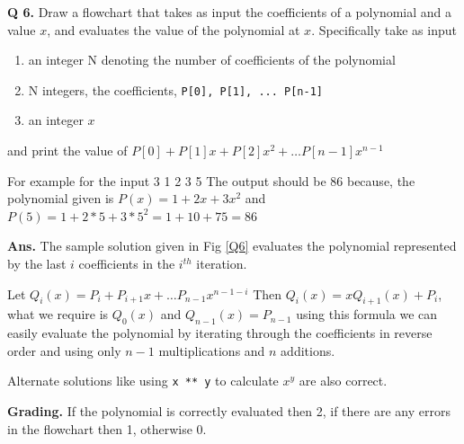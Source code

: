 \documentclass{article}
\begin{document}
\clearpage


\begin{flushleft}

\textbf{Q 6. } Draw a flowchart that takes as input the coefficients of a polynomial and a value $x$, 
and evaluates the value of the polynomial at $x$. Specifically take as input
\begin{enumerate}
    \item an integer N denoting the number of coefficients of the polynomial
    \item N integers, the coefficients, \lstinline{P[0], P[1], ... P[n-1]}
    \item an integer $x$
\end{enumerate}
and print the value of $P[0] + P[1] x + P[2] x^2 + \ldots P[n-1] x^{n-1}$

For example for the input
    3
    1 2 3
    5
The output should be 
    86
because, the polynomial given is $P(x) = 1 + 2x + 3x^2$
and $P(5) = 1 + 2 * 5 + 3 * 5^2 = 1 + 10 + 75 = 86$


\end{flushleft}

\begin{flushleft}

\textbf{Ans. } The sample solution given in Fig \ref{Q6} evaluates the polynomial represented by the last $i$ 
coefficients in the $i^{th}$ iteration. 

Let $Q_i(x) = P_i + P_{i+1} x + \dots P_{n-1} x ^ {n-1-i}$
Then $Q_i(x) = x Q_{i+1}(x) + P_i$, what we require is $Q_0(x)$ and $Q_{n-1}(x) = P_{n-1}$
using this formula we can easily evaluate the polynomial by iterating through the coefficients in 
reverse order and using only $n-1$ multiplications and $n$ additions.

Alternate solutions like using \lstinline{x ** y} to calculate $x^y$ are also correct.

\end{flushleft}

\begin{flushleft}

\textbf{Grading. } If the polynomial is correctly evaluated then 2, if there are any errors in the flowchart 
then 1, otherwise 0.

\end{flushleft}
\end{document}
